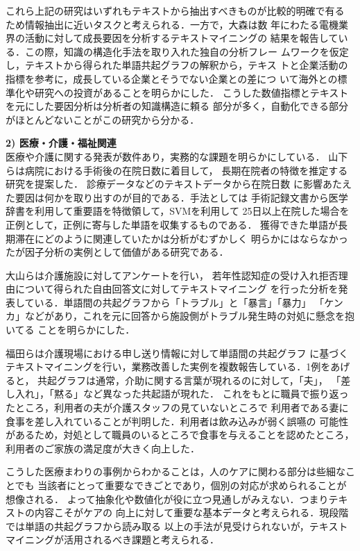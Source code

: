 \documentclass[twocolumn]{jarticle}
\begin{document}
これら上記の研究はいずれもテキストから抽出すべきものが比較的明確で有る
ため情報抽出に近いタスクと考えられる．一方で，大森\cite{ohmori2013}は数
年にわたる電機業界の活動に対して成長要因を分析するテキストマイニングの
結果を報告している．この際，知識の構造化手法を取り入れた独自の分析フレー
ムワークを仮定し，テキストから得られた単語共起グラフの解釈から，テキス
トと企業活動の指標を参考に，成長している企業とそうでない企業との差につ
いて海外との標準化や研究への投資があることを明らかにした．
こうした数値指標とテキストを元にした要因分析は分析者の知識構造に頼る
部分が多く，自動化できる部分がほとんどないことがこの研究から分かる．

{\bf 2) 医療・介護・福祉関連}\\
医療や介護に関する発表が数件あり，実務的な課題を明らかにしている．
山下ら\cite{yamashita2014}は病院における手術後の在院日数に着目して，
長期在院者の特徴を推定する研究を提案した．
診療データなどのテキストデータから在院日数
に影響あたえた要因は何かを取り出すのが目的である．手法としては
手術記録文書から医学辞書を利用して重要語を特徴領して，SVMを利用して
25日以上在院した場合を正例として，正例に寄与した単語を収集するものである．
獲得できた単語が長期滞在にどのように関連していたかは分析がむずかしく
明らかにはならなかったが因子分析の実例として価値がある研究である．

大山らは\cite{ohyama2014}介護施設に対してアンケートを行い，
若年性認知症の受け入れ拒否理由について得られた自由回答文に対してテキストマイニング
を行った分析を発表している．単語間の共起グラフから「トラブル」と「暴言」「暴力」 
「ケンカ」などがあり，これを元に回答から施設側がトラブル発生時の対処に懸念を抱いてる
ことを明らかにした．

福田ら\cite{fukuda2014}は介護現場における申し送り情報に対して単語間の共起グラフ
に基づくテキストマイニングを行い，業務改善した実例を複数報告している．1例をあげると，
共起グラフは通常，介助に関する言葉が現れるのに対して，「夫」，
「差し入れ」，「黙る」など異なった共起語が現れた．
これをもとに職員で振り返ったところ，利用者の夫が介護スタッフの見ていないところで
利用者である妻に食事を差し入れていることが判明した．利用者は飲み込みが弱く誤嚥の
可能性があるため，対処として職員のいるところで食事を与えることを認めたところ，
利用者のご家族の満足度が大きく向上した．

こうした医療まわりの事例からわかることは，人のケアに関わる部分は些細なことでも
当該者にとって重要なできごとであり，個別の対応が求められることが想像される．
よって抽象化や数値化が役に立つ見通しがみえない．つまりテキストの内容こそがケアの
向上に対して重要な基本データと考えられる．現段階では単語の共起グラフから読み取る
以上の手法が見受けられないが，テキストマイニングが活用されるべき課題と考えられる．
\end{document}
